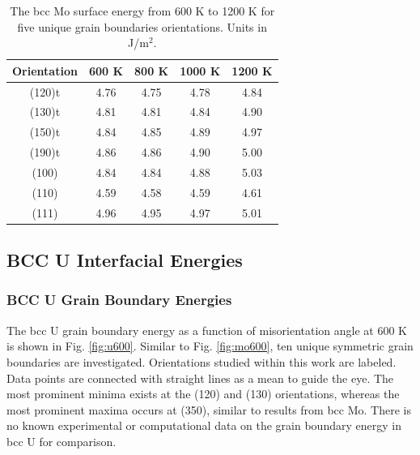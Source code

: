 \documentclass[review]{elsarticle}
\begin{document}
\begin{table}[h]
\caption{The bcc Mo surface energy from 600 K to 1200 K for five unique grain boundaries orientations. Units in J/m$^{2}$. } \label{tab:mosurf}
\begin{center}
\begin{tabular}{|c|c|c|c|c|}
	\hline
	Orientation & 600 K & 800 K & 1000 K & 1200 K \\
	 \hline
	 (120)t & 4.76 & 4.75 & 4.78 & 4.84 \\
	 (130)t & 4.81 & 4.81 & 4.84 & 4.90 \\
	 (150)t & 4.84 & 4.85 & 4.89 & 4.97 \\
	 (190)t & 4.86 & 4.86 & 4.90 & 5.00 \\
         (100) & 4.84 & 4.84 & 4.88 & 5.03 \\
	 (110) & 4.59 & 4.58 & 4.59 & 4.61 \\
	 (111) & 4.96 & 4.95 & 4.97 & 5.01 \\	 
	 \hline
\end{tabular}
\end{center}
\label{default}
\end{table}

\FloatBarrier



\subsection{BCC U Interfacial Energies}
\subsubsection{BCC U Grain Boundary Energies}

The bcc U grain boundary energy as a function of misorientation angle at 600 K is shown in Fig. \ref{fig:u600}. Similar to Fig. \ref{fig:mo600}, ten unique symmetric grain boundaries are investigated. Orientations studied within this work are labeled. Data points are connected with straight lines as a mean to guide the eye. The most prominent  minima exists at the (120)  and (130) orientations, whereas the most prominent maxima occurs at (350), similar to results from bcc Mo. There is no known experimental or computational data on the grain boundary energy in bcc U for comparison.
\end{document}
